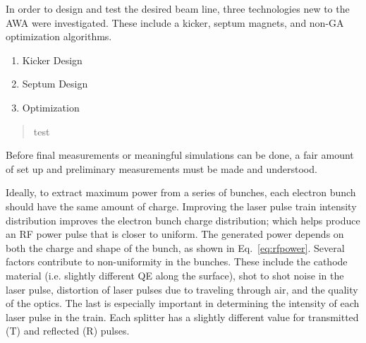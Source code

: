 
In order to design and test the desired beam line, three technologies 
new to the AWA were investigated. These include a kicker, septum magnets, 
and non-GA optimization algorithms.

\begin{enumerate}
	\item Kicker Design
	\item Septum Design
	\item Optimization 
\end{enumerate}

\begin{quotation}
	test
\end{quotation}






Before final measurements or meaningful simulations can be done, 
a fair amount of set up and preliminary measurements 
must be made and understood. 

 \label{sec:uvoptics}

Ideally, to extract maximum power from a series of bunches, each electron bunch should have the same amount of charge.  Improving the laser pulse train intensity distribution improves the electron bunch charge distribution; 
which  helps produce an RF power pulse that is closer to uniform. 
The generated power depends on both the charge and shape of the bunch, as shown in Eq.~\ref{eq:rfpower}. 
Several factors contribute to non-uniformity in the bunches. These include the cathode material
(i.e. slightly different QE along the surface), shot to shot noise in the laser pulse, 
distortion of laser pulses due to traveling through air, and the quality of the optics. 
The last is especially important in determining the intensity of each laser pulse in the train.  
Each splitter has a slightly different value for transmitted (T) and reflected (R) pulses. 

